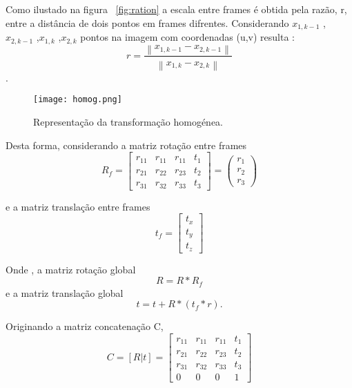 Como ilustado na figura ~\ref{fig:ration} a escala entre frames é obtida pela razão, r, entre a distância de dois pontos em frames difrentes. Considerando \textit{$x_{1,k-1}$} , \textit{$x_{2,k-1}$} ,\textit{$x_{1,k}$} ,\textit{$x_{2,k}$} pontos na imagem com coordenadas (u,v) resulta : \[ r = \frac{\left \| x_{1,k-1} - x_{2,k-1} \right \|}{\left \| x_{1,k} - x_{2,k} \right \|} \] .

\begin{figure}[h!] %
	\begin{center}
		\leavevmode		
		\texttt{[image: homog.png]}
		\caption{Representação da transformação homogénea.}
		\label{fig:homog}
	\end{center}
\end{figure}

\vspace{5mm}  %

Desta forma, considerando a matriz rotação entre frames \[  R_f = \left[ \begin{array}{cccc}
r_{11} & r_{11} & r_{11} & t_1 \\ 
r_{21} & r_{22} & r_{23} & t_2 \\ 
r_{31} & r_{32} & r_{33} & t_3 
\end{array} \right] = \left(\begin{array}{ccc}
r_1 \\ r_2 \\ r_3
\end{array}\right)\]

e a matriz translação entre frames \[ t_f = \left[ \begin{array}{ccc}
t_x \\ t_y \\ t_z
\end{array}\right]\]

Onde , a matriz rotação global \[ R = R * R_f\]
e a matriz translação global \[ t = t + R * ( t_f * r ) . \]

Originando a matriz concatenação C, \[ C = \left[ R | t \right] = \left[ \begin{array}{cccc}
r_{11} & r_{11} & r_{11} & t_1 \\ 
r_{21} & r_{22} & r_{23} & t_2 \\ 
r_{31} & r_{32} & r_{33} & t_3 \\ 
0 & 0 & 0 & 1
\end{array} \right] \] 







